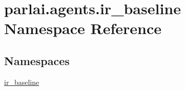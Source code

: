 \hypertarget{namespaceparlai_1_1agents_1_1ir__baseline}{}\section{parlai.\+agents.\+ir\+\_\+baseline Namespace Reference}
\label{namespaceparlai_1_1agents_1_1ir__baseline}
\subsection*{Namespaces}
\begin{DoxyCompactItemize}
\item 
 \hyperlink{namespaceparlai_1_1agents_1_1ir__baseline_1_1ir__baseline}{ir\+\_\+baseline}
\end{DoxyCompactItemize}
